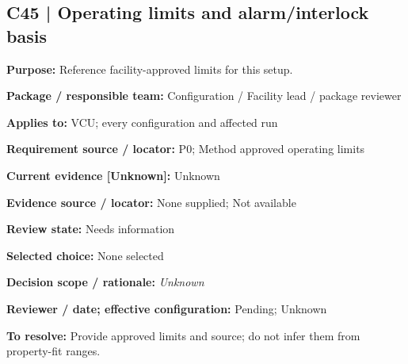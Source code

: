 \documentclass[11pt]{article}
\begin{document}
\par\noindent\begin{minipage}{\textwidth}\small\setlength{\parskip}{2pt}
\subsection*{C45 | Operating limits and alarm/interlock basis}
\textbf{Purpose:} Reference facility-approved limits for this setup.\par
\textbf{Package / responsible team:} Configuration / Facility lead / package reviewer\par
\textbf{Applies to:} VCU; every configuration and affected run\par
\textbf{Requirement source / locator:} P0; Method approved operating limits\par
\textbf{Current evidence [Unknown]:} Unknown\par
\textbf{Evidence source / locator:} None supplied; Not available\par
\textbf{Review state:} Needs information\par
\textbf{Selected choice:} None selected\par
\textbf{Decision scope / rationale:} \textit{Unknown}\par
\textbf{Reviewer / date; effective configuration:} Pending; Unknown\par
\textbf{To resolve:} Provide approved limits and source; do not infer them from property-fit ranges.\par
\end{minipage}\par\vspace{5pt}
\end{document}

